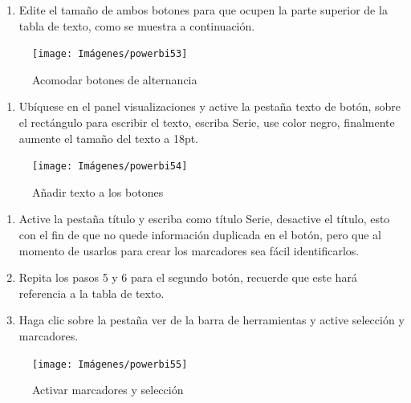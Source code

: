 \documentclass[
]{book}
\providecommand{\tightlist}{%
  \setlength{\itemsep}{0pt}\setlength{\parskip}{0pt}}
\begin{document}
\begin{enumerate}
\def\labelenumi{\arabic{enumi}.}
\setcounter{enumi}{3}
\tightlist
\item
  Edite el tamaño de ambos botones para que ocupen la parte superior de la tabla de texto, como se muestra a continuación.
\end{enumerate}

\begin{figure}

{\centering \texttt{[image: Imágenes/powerbi53]} 

}

\caption{Acomodar botones de alternancia}\label{fig:paso4alternancia-fig}
\end{figure}

\begin{enumerate}
\def\labelenumi{\arabic{enumi}.}
\setcounter{enumi}{4}
\tightlist
\item
  Ubíquese en el panel visualizaciones y active la pestaña texto de botón, sobre el rectángulo para escribir el texto, escriba Serie, use color negro, finalmente aumente el tamaño del texto a 18pt.
\end{enumerate}

\begin{figure}

{\centering \texttt{[image: Imágenes/powerbi54]} 

}

\caption{Añadir texto a los botones}\label{fig:paso5alternancia-fig}
\end{figure}

\begin{enumerate}
\def\labelenumi{\arabic{enumi}.}
\setcounter{enumi}{5}
\item
  Active la pestaña título y escriba como título Serie, desactive el título, esto con el fin de que no quede información duplicada en el botón, pero que al momento de usarlos para crear los marcadores sea fácil identificarlos.
\item
  Repita los pasos 5 y 6 para el segundo botón, recuerde que este hará referencia a la tabla de texto.
\item
  Haga clic sobre la pestaña ver de la barra de herramientas y active selección y marcadores.
\end{enumerate}

\begin{figure}

{\centering \texttt{[image: Imágenes/powerbi55]} 

}

\caption{Activar marcadores y selección}\label{fig:paso8alternancia-fig}
\end{figure}
\end{document}
